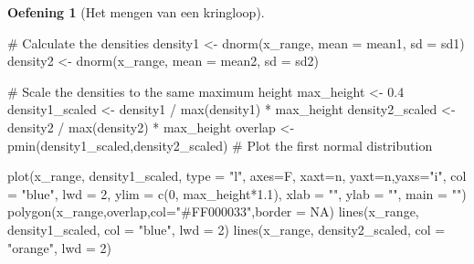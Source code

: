 \documentclass[
  a4paper,
]{scrbook}
\newenvironment{Shaded}{\begin{snugshade}}{\end{snugshade}}
\newcommand{\AttributeTok}[1]{\textcolor[rgb]{0.40,0.45,0.13}{#1}}
\newcommand{\CommentTok}[1]{\textcolor[rgb]{0.37,0.37,0.37}{#1}}
\newcommand{\ConstantTok}[1]{\textcolor[rgb]{0.56,0.35,0.01}{#1}}
\newcommand{\DecValTok}[1]{\textcolor[rgb]{0.68,0.00,0.00}{#1}}
\newcommand{\FloatTok}[1]{\textcolor[rgb]{0.68,0.00,0.00}{#1}}
\newcommand{\FunctionTok}[1]{\textcolor[rgb]{0.28,0.35,0.67}{#1}}
\newcommand{\NormalTok}[1]{\textcolor[rgb]{0.00,0.23,0.31}{#1}}
\newcommand{\OtherTok}[1]{\textcolor[rgb]{0.00,0.23,0.31}{#1}}
\newcommand{\SpecialCharTok}[1]{\textcolor[rgb]{0.37,0.37,0.37}{#1}}
\newcommand{\StringTok}[1]{\textcolor[rgb]{0.13,0.47,0.30}{#1}}
\theoremstyle{definition}
\newtheorem{exercise}{Oefening}[chapter]
\theoremstyle{remark}
\begin{document}
\begin{exercise}[Het mengen van een
kringloop]
\begin{Shaded}
\begin{Highlighting}[]
  \CommentTok{\# Calculate the densities}
\NormalTok{  density1 }\OtherTok{\textless{}{-}} \FunctionTok{dnorm}\NormalTok{(x\_range, }\AttributeTok{mean =}\NormalTok{ mean1, }\AttributeTok{sd =}\NormalTok{ sd1)}
\NormalTok{  density2 }\OtherTok{\textless{}{-}} \FunctionTok{dnorm}\NormalTok{(x\_range, }\AttributeTok{mean =}\NormalTok{ mean2, }\AttributeTok{sd =}\NormalTok{ sd2)}
  
  \CommentTok{\# Scale the densities to the same maximum height}
\NormalTok{  max\_height }\OtherTok{\textless{}{-}} \FloatTok{0.4}
\NormalTok{  density1\_scaled }\OtherTok{\textless{}{-}}\NormalTok{ density1 }\SpecialCharTok{/} \FunctionTok{max}\NormalTok{(density1) }\SpecialCharTok{*}\NormalTok{ max\_height}
\NormalTok{  density2\_scaled }\OtherTok{\textless{}{-}}\NormalTok{ density2 }\SpecialCharTok{/} \FunctionTok{max}\NormalTok{(density2) }\SpecialCharTok{*}\NormalTok{ max\_height}
\NormalTok{  overlap }\OtherTok{\textless{}{-}} \FunctionTok{pmin}\NormalTok{(density1\_scaled,density2\_scaled)}
  \CommentTok{\# Plot the first normal distribution}
  
  \FunctionTok{plot}\NormalTok{(x\_range, density1\_scaled, }\AttributeTok{type =} \StringTok{"l"}\NormalTok{, }
       \AttributeTok{axes=}\NormalTok{F, }\AttributeTok{xaxt=}\StringTok{\textquotesingle{}n\textquotesingle{}}\NormalTok{, }\AttributeTok{yaxt=}\StringTok{\textquotesingle{}n\textquotesingle{}}\NormalTok{,}\AttributeTok{yaxs=}\StringTok{"i"}\NormalTok{,}
       \AttributeTok{col =} \StringTok{"blue"}\NormalTok{, }\AttributeTok{lwd =} \DecValTok{2}\NormalTok{, }\AttributeTok{ylim =} \FunctionTok{c}\NormalTok{(}\DecValTok{0}\NormalTok{, max\_height}\SpecialCharTok{*}\FloatTok{1.1}\NormalTok{), }
       \AttributeTok{xlab =} \StringTok{""}\NormalTok{, }\AttributeTok{ylab =} \StringTok{""}\NormalTok{, }\AttributeTok{main =} \StringTok{""}\NormalTok{)}
  \FunctionTok{polygon}\NormalTok{(x\_range,overlap,}\AttributeTok{col=}\StringTok{"\#FF000033"}\NormalTok{,}\AttributeTok{border =} \ConstantTok{NA}\NormalTok{)}
  \FunctionTok{lines}\NormalTok{(x\_range, density1\_scaled, }\AttributeTok{col =} \StringTok{"blue"}\NormalTok{, }\AttributeTok{lwd =} \DecValTok{2}\NormalTok{)}
  \FunctionTok{lines}\NormalTok{(x\_range, density2\_scaled, }\AttributeTok{col =} \StringTok{"orange"}\NormalTok{, }\AttributeTok{lwd =} \DecValTok{2}\NormalTok{)}
  

\end{Highlighting}
\end{Shaded}
\end{exercise}
\end{document}
